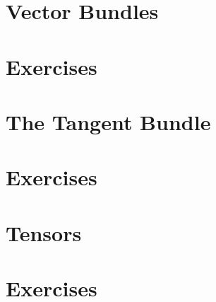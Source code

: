 \section{Vector Bundles}
\section*{Exercises}
\section{The Tangent Bundle}
\section*{Exercises}
\section{Tensors}
\section*{Exercises}